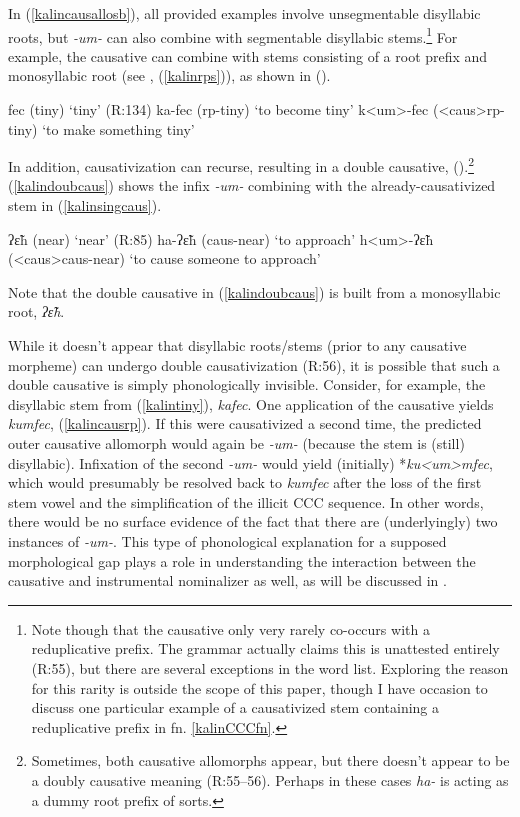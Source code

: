 \documentclass[output=paper]{langscibook}
\newcounter{nexttmp}    %
\newcommand{\Next}{\setcounter{nexttmp}{\value{equation}}\stepcounter{nexttmp}(\thenexttmp)\xspace}
\begin{document}
In (\ref{kalincausallosb}), all provided examples involve unsegmentable disyllabic roots, but \textit{-um-} can also combine with segmentable disyllabic stems.\footnote{Note though that the causative only very rarely co-occurs with a reduplicative prefix. The grammar actually claims this is unattested entirely (R:55), but there are several exceptions in the word list. Exploring the reason for this rarity is outside the scope of this paper, though I have occasion to discuss one particular example of a causativized stem containing a reduplicative prefix in fn. \ref{kalinCCCfn}.\label{kalinredfn}} For example, the causative can combine with stems consisting of a root prefix and monosyllabic root (see , (\ref{kalinrps})), as shown in \Next.

\ea \ea fec (tiny) \hfill `tiny' (R:134)
\ex ka-fec ({\sc rp}-tiny) \hfill `to become tiny'\label{kalintiny}
\ex\label{kalincausrp} k<um>-fec ({\sc <caus>rp}-tiny) \hfill `to make something tiny'
\z
\z

\noindent In addition, causativization can recurse, resulting in a double causative, \Next.\footnote{Sometimes, both causative allomorphs appear, but there doesn't appear to be a doubly causative meaning (R:55--56). Perhaps in these cases \textit{ha-} is acting as a dummy root prefix of sorts.} (\ref{kalindoubcaus}) 
shows the infix \textit{-um-} combining with the already-causativized stem in (\ref{kalinsingcaus}).%

\ea \ea ʔ\~εh (near) \hfill `near'  (R:85)
\ex ha-ʔ\~εh ({\sc caus-}near) \hfill `to approach'\label{kalinsingcaus}
\ex\label{kalindoubcaus} h<um>-ʔ\~εh ({\sc <caus>caus-}near)  \hfill `to cause someone to approach'
\z
\z

\noindent Note that the double causative in (\ref{kalindoubcaus}) is built from a monosyllabic root, \textit{ʔ\~εh}. 

While it doesn't appear that disyllabic roots/stems (prior to any causative morpheme) can undergo double causativization (R:56), it is possible that such a double causative is simply phonologically invisible. Consider, for example, the disyllabic stem from (\ref{kalintiny}), \textit{kafec}. One application of the causative yields \textit{kumfec}, (\ref{kalincausrp}). If this were causativized a second time, the predicted outer causative allomorph would again be \textit{-um-} (because the stem is (still) disyllabic). Infixation of the second \textit{-um-} would yield (initially) *\textit{ku<um>mfec}, which would presumably be resolved back to \textit{kumfec} after the loss of the first stem vowel and the simplification of the illicit CCC sequence. In other words, there would be no surface evidence of the fact that there are (underlyingly) two instances of \textit{-um-}. This type of phonological explanation for a supposed morphological gap plays a role in understanding the interaction between the causative and instrumental nominalizer as well, as will be discussed in .
\end{document}
